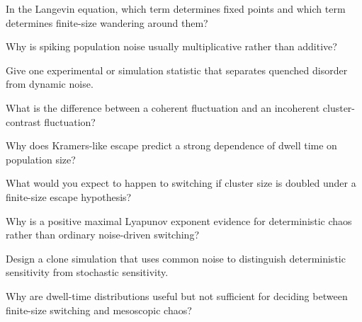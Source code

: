 \begin{conceptquestions}
  \item In the Langevin equation, which term determines fixed points and which term determines finite-size wandering around them?
  \item Why is spiking population noise usually multiplicative rather than additive?
  \item Give one experimental or simulation statistic that separates quenched disorder from dynamic noise.
  \item What is the difference between a coherent fluctuation and an incoherent cluster-contrast fluctuation?
  \item Why does Kramers-like escape predict a strong dependence of dwell time on population size?
  \item What would you expect to happen to switching if cluster size is doubled under a finite-size escape hypothesis?
  \item Why is a positive maximal Lyapunov exponent evidence for deterministic chaos rather than ordinary noise-driven switching?
  \item Design a clone simulation that uses common noise to distinguish deterministic sensitivity from stochastic sensitivity.
  \item Why are dwell-time distributions useful but not sufficient for deciding between finite-size switching and mesoscopic chaos?
\end{conceptquestions}

